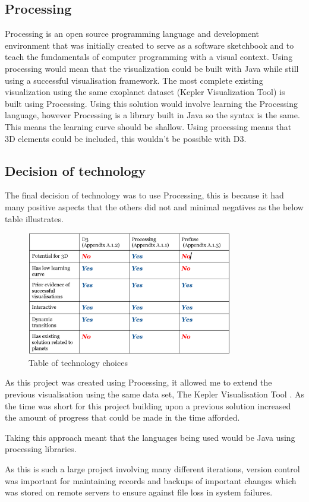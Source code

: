 \subsection{Processing}
Processing is an open source programming language and development environment
that was initially created to serve as a software
sketchbook and to teach the fundamentals of computer programming with a visual
context.
Using processing would mean that the visualization could be built with Java
while still using
a successful visualisation framework. The most complete existing visualization
using
the same exoplanet dataset (Kepler Visualization Tool) is built using
Processing.
Using this solution would involve learning the Processing language, however
Processing
is a library built in Java so the syntax is the same. This means the learning
curve should be shallow.
Using processing means that 3D elements could be included, this wouldn't be
possible with D3.

\subsection{Decision of technology}
The final decision of technology was to use Processing, this is because it had
many positive aspects that the others did not and minimal negatives as the below
table illustrates.
\clearpage
\begin{figure}[h!]
  \centering
      \includegraphics[width=0.8\textwidth]{images/table_technologies.jpg}
  \caption{Table of technology choices}
\end{figure}

As this project was created using Processing, it allowed me to extend the
previous visualisation using the same data set, The Kepler Visualisation Tool
\cite{kepler_github, kepler_article}. As the time was short for this project
building upon a previous solution increased the amount of progress that could be
made in the time afforded.

Taking this approach meant that the languages being used would be Java using
processing libraries. 

As this is such a large project involving many different iterations, version
control was important for maintaining records and backups of important changes
which was stored on remote servers to ensure against file loss in system
failures.
